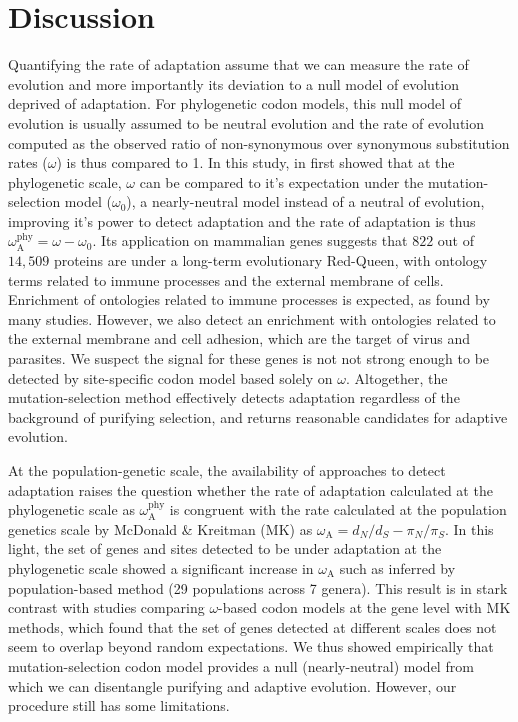 \documentclass{article}
\newcommand{\dn}{d_N}
\newcommand{\ds}{d_S}
\newcommand{\dnds}{\dn / \ds}
\newcommand{\rateApop}{\omega_{\mathrm{A}}}
\newcommand{\rateAphy}{\rateApop^{\mathrm{phy}}}
\newcommand{\pn}{\pi_N}
\newcommand{\ps}{\pi_S}
\newcommand{\pnps}{\pn / \ps}
\begin{document}
    \section*{Discussion}\label{sec:discussion}

    Quantifying the rate of adaptation assume that we can measure the rate of evolution and more importantly its deviation to a null model of evolution deprived of adaptation.
    For phylogenetic codon models, this null model of evolution is usually assumed to be neutral evolution and the rate of evolution computed as the observed ratio of non-synonymous over synonymous substitution rates ($\omega$) is thus compared to 1.
    In this study, in first showed that at the phylogenetic scale, $\omega$ can be compared to it's expectation under the mutation-selection model ($\omega_{0}$), a nearly-neutral model instead of a neutral of evolution, improving it's power to detect adaptation and the rate of adaptation is thus $\rateAphy = \omega - \omega_{0}$.
    Its application on mammalian genes suggests that $822$ out of $14,509$ proteins are under a long-term evolutionary Red-Queen, with ontology terms related to immune processes and the external membrane of cells.
    Enrichment of ontologies related to immune processes is expected, as found by many studies\cite{kosiol_patterns_2008, enard_viruses_2016, ebel_high_2017}.
    However, we also detect an enrichment with ontologies related to the external membrane and cell adhesion, which are the target of virus and parasites.
    We suspect the signal for these genes is not not strong enough to be detected by site-specific codon model based solely on $\omega$.
    Altogether, the mutation-selection method effectively detects adaptation regardless of the background of purifying selection, and returns reasonable candidates for adaptive evolution.

    At the population-genetic scale, the availability of approaches to detect adaptation\cite{mcdonald_adaptative_1991, messer_frequent_2013} raises the question whether the rate of adaptation calculated at the phylogenetic scale as $\rateAphy$ is congruent with the rate calculated at the population genetics scale by McDonald \& Kreitman (MK)\cite{mcdonald_adaptative_1991} as $\rateApop = \dnds - \pnps$.
    In this light, the set of genes and sites detected to be under adaptation at the phylogenetic scale showed a significant increase in $\rateApop$ such as inferred by population-based method (29 populations across 7 genera).
    This result is in stark contrast with studies comparing $\omega$-based codon models at the gene level with MK methods, which found that the set of genes detected at different scales does not seem to overlap beyond random expectations\cite{chen_two_2021}.
    We thus showed empirically that mutation-selection codon model provides a null (nearly-neutral) model from which we can disentangle purifying and adaptive evolution.
    However, our procedure still has some limitations.
\end{document}

